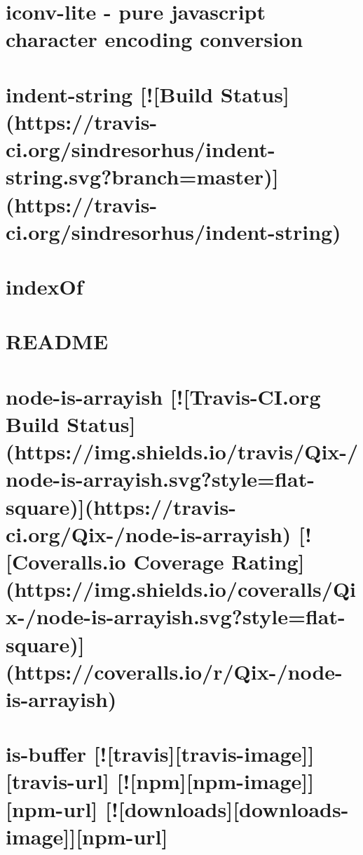 \documentclass[twoside]{book}
\newcommand{\+}{\discretionary{\mbox{\scriptsize$\hookleftarrow$}}{}{}}
\begin{document}
\chapter{iconv-\/lite -\/ pure javascript character encoding conversion}
\label{md_app_web_node_modules_iconv-lite__r_e_a_d_m_e}

\chapter{indent-\/string \mbox{[}!\mbox{[}Build Status\mbox{]}(https\+://travis-\/ci.org/sindresorhus/indent-\/string.svg?branch=master)\mbox{]}(https\+://travis-\/ci.org/sindresorhus/indent-\/string)}
\label{md_app_web_node_modules_indent-string_readme}

\chapter{index\+Of}
\label{md_app_web_node_modules_indexof__readme}

\chapter{R\+E\+A\+D\+ME}
\label{md_app_web_node_modules_inherits__r_e_a_d_m_e}

\chapter{node-\/is-\/arrayish \mbox{[}!\mbox{[}Travis-\/\+CI.org Build Status\mbox{]}(https\+://img.shields.\+io/travis/\+Qix-\//node-\/is-\/arrayish.svg?style=flat-\/square)\mbox{]}(https\+://travis-\/ci.org/\+Qix-\//node-\/is-\/arrayish) \mbox{[}!\mbox{[}Coveralls.\+io Coverage Rating\mbox{]}(https\+://img.shields.\+io/coveralls/\+Qix-\//node-\/is-\/arrayish.svg?style=flat-\/square)\mbox{]}(https\+://coveralls.io/r/\+Qix-\//node-\/is-\/arrayish)}
\label{md_app_web_node_modules_is-arrayish__r_e_a_d_m_e}

\chapter{is-\/buffer \mbox{[}!\mbox{[}travis\mbox{]}\mbox{[}travis-\/image\mbox{]}\mbox{]}\mbox{[}travis-\/url\mbox{]} \mbox{[}!\mbox{[}npm\mbox{]}\mbox{[}npm-\/image\mbox{]}\mbox{]}\mbox{[}npm-\/url\mbox{]} \mbox{[}!\mbox{[}downloads\mbox{]}\mbox{[}downloads-\/image\mbox{]}\mbox{]}\mbox{[}npm-\/url\mbox{]}}
\label{md_app_web_node_modules_is-buffer__r_e_a_d_m_e}

\end{document}
